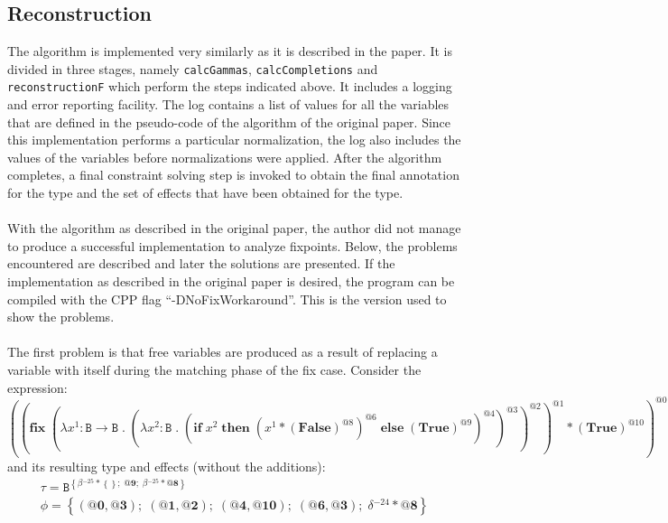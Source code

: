 \documentclass[8pt]{extarticle}
\begin{document}
\subsection{Reconstruction}
\label{sec:reconstruction}
The algorithm is implemented very similarly as it is described in the paper. It is divided in three stages, namely \verb+calcGammas+, \verb+calcCompletions+ and \verb+reconstructionF+ which perform the steps indicated above. It includes a logging and error reporting facility. The log contains a list of values for all the variables that are defined in the pseudo-code of the algorithm of the original paper. Since this implementation performs a particular normalization, the log also includes the values of the variables before normalizations were applied. After the algorithm completes, a final constraint solving step is invoked to obtain the final annotation for the type and the set of effects that have been obtained for the type.
\\\\
With the algorithm as described in the original paper, the author did not manage to produce a successful implementation to analyze fixpoints. Below, the problems encountered are described and later the solutions are presented. If the implementation as described in the original paper is desired, the program can be compiled with the CPP flag ``-DNoFixWorkaround''. This is the version used to show the problems.
\\\\
The first problem is that free variables are produced as a result of replacing a variable with itself during the matching phase of the fix case. Consider the expression:
\[
\left(\left(\mathbf{fix}\;{}\left(\lambda{}x^{1}:\mathtt{B}\to{}\mathtt{B}\;{}.\;{}\left(\lambda{}x^{2}:\mathtt{B}\;{}.\;{}\left(\mathbf{if}\;{}x^{2}\;{}\mathbf{then}\;{}\left(x^{1}*\left(\mathbf{False}\right)^{\mathit{@8}}\right)^{\mathit{@6}}\;{}\mathbf{else}\;{}\left(\mathbf{True}\right)^{\mathit{@9}}\right)^{\mathit{@4}}\right)^{\mathit{@3}}\right)^{\mathit{@2}}\right)^{\mathit{@1}}*\left(\mathbf{True}\right)^{\mathit{@10}}\right)^{\mathit{@0}}
\]
and its resulting type and effects (without the additions):
\[
\begin{array}{c}
\tau=\mathtt{B}^{\left\{\beta{}^{-25}*\left\{\right\};\;{}\textbf{@9};\;{}\beta{}^{-25}*\textbf{@8}\right\}} \\
\phi=\left\{\left(\textbf{@0},\textbf{@3}\right);\;{}\left(\textbf{@1},\textbf{@2}\right);\;{}\left(\textbf{@4},\textbf{@10}\right);\;{}\left(\textbf{@6},\textbf{@3}\right);\;{}\delta{}^{-24}*\textbf{@8}\right\}
\end{array}
\]
\end{document}
